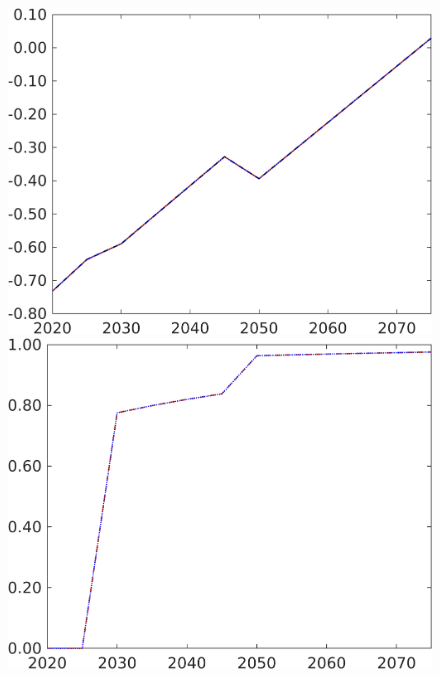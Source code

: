\begin{figure}[h!!]
\begin{minipage}[]{0.32\textwidth}
	\end{minipage}
	\begin{minipage}[]{0.32\textwidth}
		\includegraphics[width=1\textwidth]{../../codding_model/own_basedOnFried/optimalPol_190722_tidiedUp/figures/all_July22/SWF_DDCompEffOPT_T_NoTaus_pol4_spillover0_noskill0_sep1_xgrowth1_etaa0.79_lgd0_lff0.png}
	\end{minipage}
	\begin{minipage}[]{0.32\textwidth}
		\includegraphics[width=1\textwidth]{../../codding_model/own_basedOnFried/optimalPol_190722_tidiedUp/figures/all_July22/tauf_DDCompEffOPT_T_NoTaus_pol4_spillover0_noskill0_sep1_xgrowth1_etaa0.79_lgd0_lff0.png}

\end{minipage}
\end{figure}
